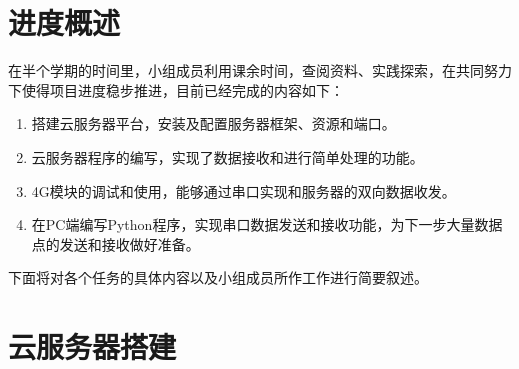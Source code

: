 \documentclass[a4paper,11pt]{ctexart}
\begin{document}
\newpage
\begin{spacing}{1.5}


\section{进度概述}
\par
在半个学期的时间里，小组成员利用课余时间，查阅资料、实践探索，在共同努力下使得项目进度稳步推进，目前已经完成的内容如下：
\begin{enumerate}[1.,topsep=0pt]
	\setlength{\itemsep}{-0.25\baselineskip}
	\item 搭建云服务器平台，安装及配置服务器框架、资源和端口。
	\item 云服务器程序的编写，实现了数据接收和进行简单处理的功能。
	\item 4G模块的调试和使用，能够通过串口实现和服务器的双向数据收发。
	\item 在PC端编写Python程序，实现串口数据发送和接收功能，为下一步大量数据点的发送和接收做好准备。
\end{enumerate}
\par
下面将对各个任务的具体内容以及小组成员所作工作进行简要叙述。

\section{云服务器搭建}

\end{spacing}
\end{document}
